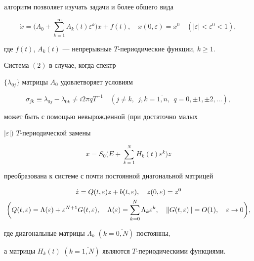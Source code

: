 алгоритм позволяет изучать задачи и более общего вида


\begin{equation}


\Dot{x}=\bigg(A_0+\sum_{k=1}^\infty A_k(t)\varepsilon^k\bigg)x + f(t),


\quad x(0,\varepsilon)=x^0\quad( |\varepsilon |< \varepsilon^0<1),


\end{equation}


где $f(t)$, $A_k(t)$ --- непрерывные $T$-периодические функции, $k\geq 1$. 








\begin{thm}


Система $(2)$ в случае, когда спектр 


$\{\lambda_{0j}\} $ матрицы $A_0$ удовлетворяет условиям


\begin{equation}


\sigma_{jk}\equiv\lambda_{0j}-\lambda_{0k}\neq i 2\pi q T^{-1}


\quad(j\neq k,\ \ j,k=\overline{1,n}, \ \ q=0,\pm 1,\pm 2,\dotsc),


\end{equation}


может быть с помощью невырожденной $($при достаточно малых 


$|\varepsilon |)$ $T$-периодической замены


$$


x= S_0\bigg(E+\sum_{k=1}^N H_k(t)\varepsilon^k\bigg)z


$$


преобразована к системе с почти постоянной диагональной матрицей


\begin{gather}


\Dot{z}= Q(t,\varepsilon)z+b(t,\varepsilon),\quad z(0,\varepsilon)=z^0\\


%


\bigg(Q(t,\varepsilon)=\Lambda(\varepsilon)+\varepsilon^{N+1}G(t,\varepsilon),


\quad \Lambda(\varepsilon)=\sum_{k=0}^N \Lambda_k\varepsilon^k,


\quad \|G(t,\varepsilon) \|=O(1),\quad \varepsilon \to 0\bigg),\notag


\end{gather}


где диагональные матрицы $\Lambda_k$ $(k=\overline{0,N})$ постоянны, 


а матрицы $H_k(t)$ $(k=\overline{1,N})$ являются $T$-периодическими функциями.


\end{thm}








